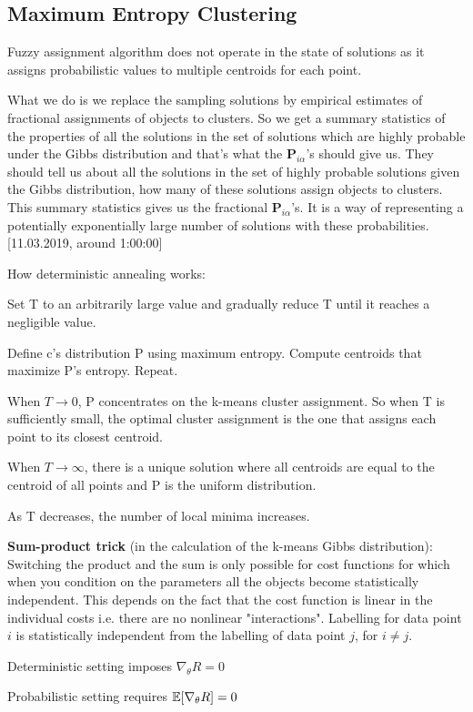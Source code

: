 \documentclass[12pt]{article}
\begin{document}
\subsection{Maximum Entropy Clustering}
\par Fuzzy assignment algorithm does not operate in the state of solutions as it assigns probabilistic values to multiple centroids for each point.
\par What we do is we replace the sampling solutions by empirical estimates of fractional assignments of objects to clusters. So we get a summary statistics of the properties of all the solutions in the set of solutions which are highly probable under the Gibbs distribution and that's what the $\mathbf{P}_{i\alpha}$'s should give us. They should tell us about all the solutions in the set of highly probable solutions given the Gibbs distribution, how many of these solutions assign objects to clusters. This summary statistics gives us the fractional $\mathbf{P}_{i\alpha}$'s. It is a way of representing a potentially exponentially large number of solutions with these probabilities. [11.03.2019, around 1:00:00]
\par How deterministic annealing works:
\ulb
\item Set T to an arbitrarily large value and gradually reduce T until it reaches a negligible value.
\item Define c's distribution P using maximum entropy. Compute centroids that maximize P's entropy. Repeat.
\ule
\par When $T \rightarrow 0$, P concentrates on the k-means cluster assignment. So when T is sufficiently small, the optimal cluster assignment is the one that assigns each point to its closest centroid.
\par When $T \rightarrow \infty$, there is a unique solution where all centroids are equal to the centroid of all points and P is the uniform distribution.
\par As T decreases, the number of local minima increases.
\par \textbf{Sum-product trick} (in the calculation of the k-means Gibbs distribution): Switching the product and the sum is only possible for cost functions for which when you condition on the parameters all the objects become statistically independent. This depends on the fact that the cost function is linear in the individual costs i.e. there are no nonlinear "interactions". Labelling for data point $i$ is statistically independent from the labelling of data point $j$, for $i \neq j$.
\ulb
\item Deterministic setting imposes $\nabla_{\theta} R = 0$
\item Probabilistic setting requires $\operatorname{\mathbb{E}} [\nabla_{\theta} R] = 0$
\ule
\end{document}
